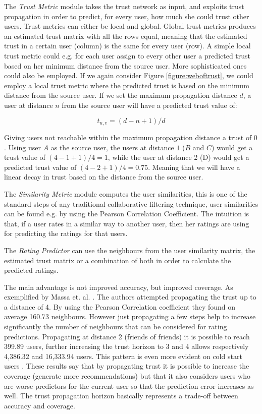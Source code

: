 The \emph{Trust Metric} module takes the trust network as input, and exploits trust propagation in order to predict, for every user, how much she could trust other users. Trust metrics can either be local and global. Global trust metrics produces an estimated trust matrix with all the rows equal, meaning that the estimated trust in a certain user (column) is the same for every user (row). A simple local trust metric could e.g. for each user assign to every other user a predicted trust based on her minimum distance from the source user. More sophisticated ones could also be employed. If we again consider Figure \ref{figure:weboftrust}, we could employ a local trust metric where the predicted trust is based on the minimum distance from the source user. If we set the maximum propagation distance $d$, a user at distance $n$ from the source user will have a predicted trust value of:

\begin{equation}
t_{u,v} = (d-n+1)/d
\end{equation}

Giving users not reachable within the maximum propagation distance a trust of $0$. Using user $A$ as the source user, the users at distance $1$ ($B$ and $C$) would get a trust value of $(4-1+1)/4 = 1$, while the user at distance 2 (D) would get a predicted trust value of $(4-2+1)/4 = 0.75$. Meaning that we will have a linear decay in trust based on the distance from the source user.

The \emph{Similarity Metric} module computes the user similarities, this is one of the standard steps of any traditional collaborative filtering technique, user similarities can be found e.g. by using the Pearson Correlation Coefficient. The intuition is that, if a user rates in a similar way to another user, then her ratings are using for predicting the ratings for that users.

The \emph{Rating Predictor} can use the neighbours from the user similarity matrix, the estimated trust matrix or a combination of both in order to calculate the predicted ratings.

The main advantage is not improved accuracy, but improved coverage. As exemplified by Massa et. al. \cite{Massa2007}. The authors attempted propagating the trust up to a distance of 4. By using the Pearson Correlation coefficient they found on average 160.73 neighbours. However just propagating a few steps help to increase significantly the number of neighbours that can be considered for rating predictions. Propagating at distance 2 (friends of friends) it is possible to reach 399.89 users, further increasing the trust horizon to 3 and 4 allows respectively 4,386.32 and 16,333.94 users. This pattern is even more evident on cold start users \cite{Massa2004}. These results say that by propagating trust it is possible to increase the coverage (generate more recommendations) but that it also considers users who are worse predictors for the current user so that the prediction error increases as well. The trust propagation horizon basically represents a trade-off between accuracy and coverage.

